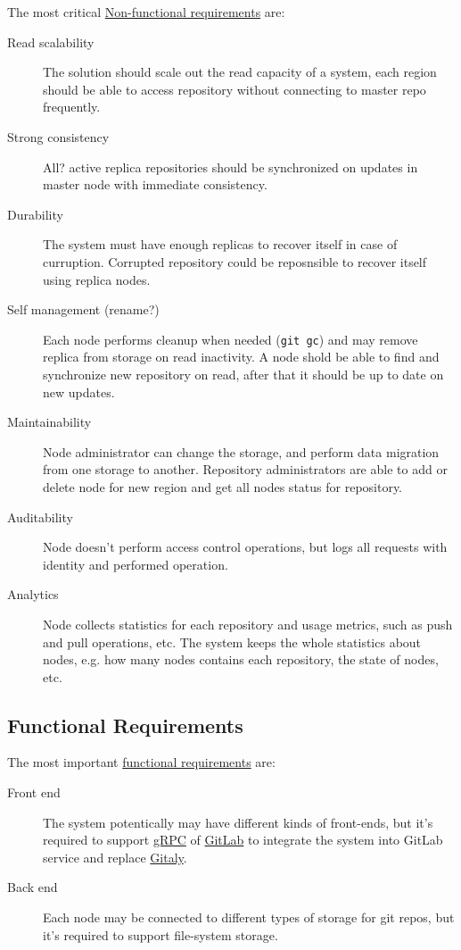 \documentclass[12pt,oneside]{article}
\begin{document}
The most critical
\href{https://en.wikipedia.org/wiki/Non-functional_requirement}{Non-functional requirements}
are:

\begin{description}
  \item[Read scalability]
    The solution should scale out the read capacity of a system, each region should be able
    to access repository without connecting to master repo frequently.
  \item[Strong consistency]
    All? active replica repositories should be synchronized on updates in master node
    with immediate consistency.
  \item[Durability]
    The system must have enough replicas to recover itself in case of curruption.
    Corrupted repository could be reposnsible to recover itself using replica nodes.
  \item[Self management (rename?)]
    Each node performs cleanup when needed (\texttt{git gc}) and may remove replica
    from storage on read inactivity.
    A node shold be able to find and synchronize new repository on read,
    after that it should be up to date on new updates.
  \item[Maintainability]
    Node administrator can change the storage, and perform data migration from one storage
    to another.
    Repository administrators are able to add or delete node for new region and
    get all nodes status for repository.
  \item[Auditability]
    Node doesn't perform access control operations, but logs all
    requests with identity and performed operation.
  \item[Analytics]
    Node collects statistics for each repository and usage metrics, such as
    push and pull operations, etc. The system keeps the whole statistics about
    nodes, e.g. how many nodes contains each repository, the state of nodes, etc.
\end{description}

\subsection{Functional Requirements}
\label{sec:nfr}

The most important \href{https://en.wikipedia.org/wiki/Functional_requirement}{functional requirements} are:

\begin{description}
  \item[Front end]
    The system potentically may have different kinds of front-ends,
    but it's required to support \href{https://grpc.io/}{gRPC}
    of \href{https://about.gitlab.com/}{GitLab} to integrate the system
    into GitLab service and replace
    \href{https://docs.gitlab.com/ee/administration/gitaly/}{Gitaly}.
  \item[Back end]
    Each node may be connected to different types of storage for git repos,
    but it's required to support file-system storage.
\end{description}
\end{document}
